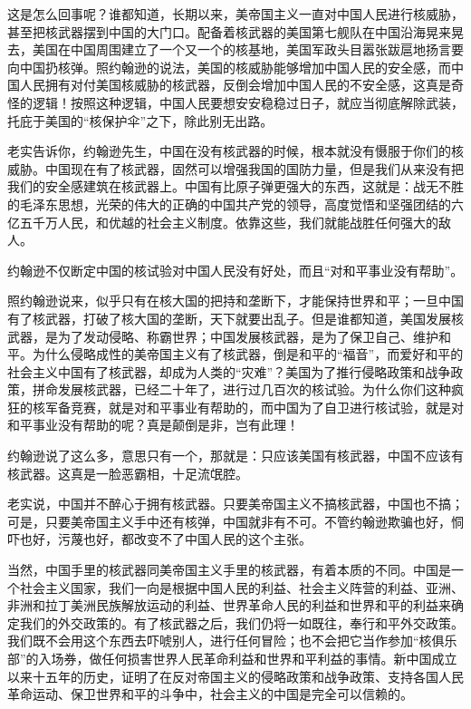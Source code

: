 这是怎么回事呢？谁都知道，长期以来，美帝国主义一直对中国人民进行核威胁，甚至把核武器摆到中国的大门口。配备着核武器的美国第七舰队在中国沿海晃来晃去，美国在中国周围建立了一个又一个的核基地，美国军政头目嚣张跋扈地扬言要向中国扔核弹。照约翰逊的说法，美国的核威胁能够增加中国人民的安全感，而中国人民拥有对付美国核威胁的核武器，反倒会增加中国人民的不安全感，这真是奇怪的逻辑！按照这种逻辑，中国人民要想安安稳稳过日子，就应当彻底解除武装，托庇于美国的“核保护伞”之下，除此别无出路。

老实告诉你，约翰逊先生，中国在没有核武器的时候，根本就没有慑服于你们的核威胁。中国现在有了核武器，固然可以增强我国的国防力量，但是我们从来没有把我们的安全感建筑在核武器上。中国有比原子弹更强大的东西，这就是：战无不胜的毛泽东思想，光荣的伟大的正确的中国共产党的领导，高度觉悟和坚强团结的六亿五千万人民，和优越的社会主义制度。依靠这些，我们就能战胜任何强大的敌人。

约翰逊不仅断定中国的核试验对中国人民没有好处，而且“对和平事业没有帮助”。

照约翰逊说来，似乎只有在核大国的把持和垄断下，才能保持世界和平；一旦中国有了核武器，打破了核大国的垄断，天下就要出乱子。但是谁都知道，美国发展核武器，是为了发动侵略、称霸世界；中国发展核武器，是为了保卫自己、维护和平。为什么侵略成性的美帝国主义有了核武器，倒是和平的“福音”，而爱好和平的社会主义中国有了核武器，却成为人类的“灾难”？美国为了推行侵略政策和战争政策，拼命发展核武器，已经二十年了，进行过几百次的核试验。为什么你们这种疯狂的核军备竞赛，就是对和平事业有帮助的，而中国为了自卫进行核试验，就是对和平事业没有帮助的呢？真是颠倒是非，岂有此理！

约翰逊说了这么多，意思只有一个，那就是：只应该美国有核武器，中国不应该有核武器。这真是一脸恶霸相，十足流氓腔。

老实说，中国并不醉心于拥有核武器。只要美帝国主义不搞核武器，中国也不搞；可是，只要美帝国主义手中还有核弹，中国就非有不可。不管约翰逊欺骗也好，恫吓也好，污蔑也好，都改变不了中国人民的这个主张。

当然，中国手里的核武器同美帝国主义手里的核武器，有着本质的不同。中国是一个社会主义国家，我们一向是根据中国人民的利益、社会主义阵营的利益、亚洲、非洲和拉丁美洲民族解放运动的利益、世界革命人民的利益和世界和平的利益来确定我们的外交政策的。有了核武器之后，我们仍将一如既往，奉行和平外交政策。我们既不会用这个东西去吓唬别人，进行任何冒险；也不会把它当作参加“核俱乐部”的入场券，做任何损害世界人民革命利益和世界和平利益的事情。新中国成立以来十五年的历史，证明了在反对帝国主义的侵略政策和战争政策、支持各国人民革命运动、保卫世界和平的斗争中，社会主义的中国是完全可以信赖的。

